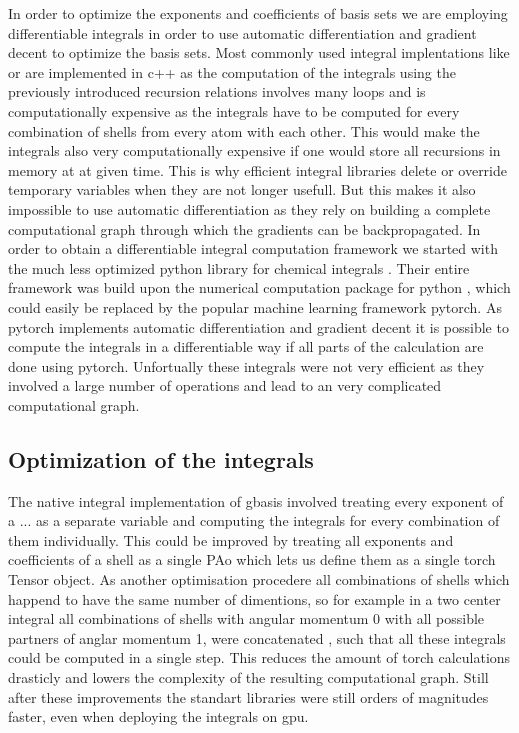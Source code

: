 In order to optimize the exponents and coefficients of basis sets we are employing differentiable integrals in order to use automatic differentiation and gradient decent to optimize the basis sets. Most commonly used integral implentations like \cite{libxc} or \cite{orca} are implemented in c++ as the computation of the integrals using the previously introduced recursion relations involves many loops and is computationally expensive as the integrals have to be computed for every combination of shells from every atom with each other. This would make the integrals also very computationally expensive if one would store all recursions in memory at at given time. This is why efficient integral libraries delete or override temporary variables when they are not longer usefull. But this makes it also impossible to use automatic differentiation as they rely on building a complete computational graph through which the gradients can be backpropagated. In order to obtain a differentiable integral computation framework we started with the much less optimized python library for chemical integrals \cite{gbasis}. Their entire framework was build upon the numerical computation package for python \cite{numpy}, which could easily be replaced by the popular machine learning framework pytorch\cite{pytorch}. As pytorch implements automatic differentiation and gradient decent it is possible to compute the integrals in a differentiable way if all parts of the calculation are done using pytorch. Unfortually these integrals were not very efficient as they involved a large number of operations and lead to an very complicated computational graph.

\subsection{Optimization of the integrals}
The native integral implementation of gbasis involved treating every exponent of a ... as a separate variable and computing the integrals for every combination of them individually. This could be improved by treating all exponents and coefficients of a shell as a single PAo which lets us define them as a single torch Tensor object. As another optimisation procedere all combinations of shells which happend to have the same number of dimentions, so for example in a two center integral all combinations of shells with angular momentum 0 with all possible partners of anglar momentum 1, were concatenated , such that all these integrals could be computed in a single step. This reduces the amount of torch calculations drasticly and lowers the complexity of the resulting computational graph.
Still after these improvements the standart libraries were still orders of magnitudes faster, even when deploying the integrals on gpu.